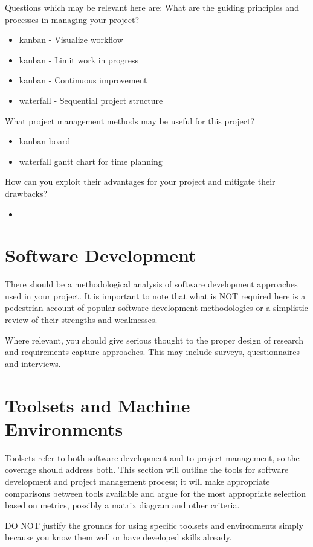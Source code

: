 Questions which may be relevant here are:
What are the guiding principles and processes in managing your project?
\begin{itemize}
\item kanban - Visualize workflow
\item kanban - Limit work in progress
\item kanban - Continuous improvement
\item waterfall - Sequential project structure
\end{itemize} 

What project management methods may be useful for this project?
\begin{itemize}
\item kanban board
\item waterfall gantt chart for time planning
\end{itemize}

How can you exploit their advantages for your project and mitigate their drawbacks?
\begin{itemize}
\item 
\end{itemize}

\section{Software Development}
There should be a methodological analysis of software development approaches used in your project. It is important to note that what is NOT required here is a pedestrian account of popular software development methodologies or a simplistic review of their strengths and weaknesses. 

Where relevant, you should give serious thought to the proper design of research and requirements capture approaches. This may include surveys, questionnaires and interviews. 

\section{Toolsets and Machine Environments}
Toolsets refer to both software development and to project management, so the coverage should address both. This section will outline the tools for software development and project management process; it will make appropriate comparisons between tools available and argue for the most appropriate selection based on metrics, possibly a matrix diagram and other criteria.

DO NOT justify the grounds for using specific toolsets and environments simply because you know them well or have developed skills already. 

